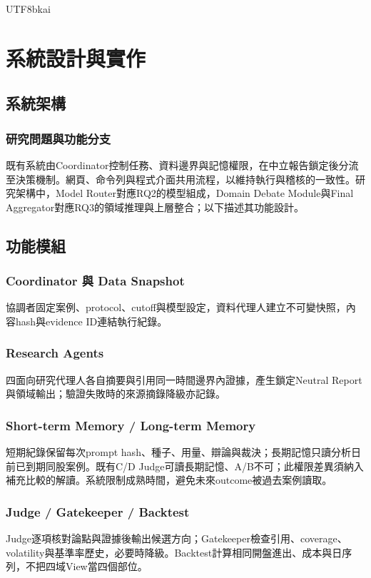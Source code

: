 \documentclass[12pt,a4paper]{article}
\begin{document}
\begin{CJK}{UTF8}{bkai}
\section{系統設計與實作}

\subsection{系統架構}

\subsubsection{研究問題與功能分支}
既有系統由Coordinator控制任務、資料邊界與記憶權限，在中立報告鎖定後分流至決策機制。網頁、命令列與程式介面共用流程，以維持執行與稽核的一致性。研究架構中，Model Router對應RQ2的模型組成，Domain Debate Module與Final Aggregator對應RQ3的領域推理與上層整合；以下描述其功能設計。

\subsection{功能模組}

\subsubsection{Coordinator 與 Data Snapshot}
協調者固定案例、protocol、cutoff與模型設定，資料代理人建立不可變快照，內容hash與evidence ID連結執行紀錄。

\subsubsection{Research Agents}
四面向研究代理人各自摘要與引用同一時間邊界內證據，產生鎖定Neutral Report與領域輸出；驗證失敗時的來源摘錄降級亦記錄。

\subsubsection{Short-term Memory / Long-term Memory}
短期紀錄保留每次prompt hash、種子、用量、辯論與裁決；長期記憶只讀分析日前已到期同股案例。既有C/D Judge可讀長期記憶、A/B不可；此權限差異須納入補充比較的解讀。系統限制成熟時間，避免未來outcome被過去案例讀取。

\subsubsection{Judge / Gatekeeper / Backtest}
Judge逐項核對論點與證據後輸出候選方向；Gatekeeper檢查引用、coverage、volatility與基準率歷史，必要時降級。Backtest計算相同開盤進出、成本與日序列，不把四域View當四個部位。


\end{CJK}
\end{document}
